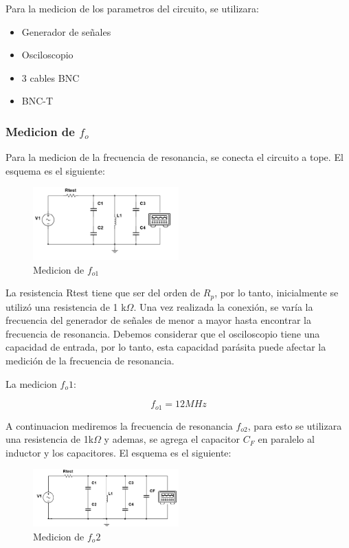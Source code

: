 Para la medicion de los parametros del circuito, se utilizara:

\begin{itemize}
    \item Generador de señales
    \item Osciloscopio
    \item 3 cables BNC
    \item BNC-T 
\end{itemize}

\subsubsection{Medicion de $f_o$}

Para la medicion de la frecuencia de resonancia, se conecta el circuito a tope. El esquema es el siguiente:

\begin{figure}[H]
    \centering
    \includegraphics[width=0.5\textwidth]{Imagenes/medicion_fo.png}
    \caption{Medicion de $f_{o1}$}

\end{figure}


La resistencia Rtest tiene que ser del orden de  $R_p$, por lo tanto, inicialmente se utilizó una resistencia de 1 k$\Omega$. Una vez realizada la conexión, se varía la frecuencia del generador 
de señales de menor a mayor hasta encontrar la frecuencia de resonancia. Debemos considerar que el osciloscopio tiene una capacidad de entrada, por lo tanto, esta capacidad parásita puede 
afectar la medición de la frecuencia de resonancia.

La medicion $f_o1$:

\begin{equation}
    \boxed{f_{o1} = 12 MHz}
\end{equation}

A continuacion mediremos la frecuencia de resonancia $f_{o2}$, para esto se utilizara una resistencia de 1k$\Omega$ y ademas, se agrega el capacitor $C_F$ en paralelo al inductor y los capacitores.
El esquema es el siguiente:

\begin{figure}[H]
    \centering
    \includegraphics[width=0.5\textwidth]{Imagenes/medicion_fo2.png}
    \caption{Medicion de $f_o2$}
\end{figure}


